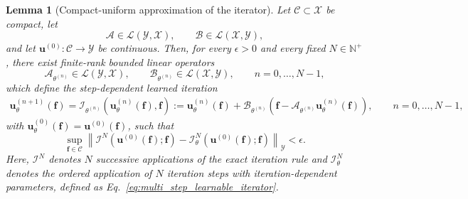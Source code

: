 \documentclass[preprint,numbers,sort&compress]{elsarticle}
\newtheorem{lemma}{Lemma}
\begin{document}
			
			\begin{lemma}[Compact-uniform approximation of the iterator]
				\label{lem:univ_iter}
				Let $\mathcal C\subset\mathcal X$ be compact,
				let
				\[
				\mathcal A\in\mathcal L(\mathcal Y,\mathcal X),
				\qquad
				\mathcal B\in\mathcal L(\mathcal X,\mathcal Y),
				\]
				and let
				$\boldsymbol u^{(0)}:\mathcal C\to\mathcal Y$
				be continuous. 
				Then, for every $\epsilon>0$ and every fixed
				$N\in\mathbb N^+$, there exist finite-rank bounded linear operators
				\[
				\mathcal A_{\theta^{(n)}}
				\in\mathcal L(\mathcal Y,\mathcal X),
				\qquad
				\mathcal B_{\theta^{(n)}}
				\in\mathcal L(\mathcal X,\mathcal Y),
				\qquad
				n=0,\ldots,N-1,
				\]
				which define the step-dependent learned iteration
				\[
				\begin{aligned}
					\boldsymbol u_\theta^{(n+1)}(\boldsymbol f)
					=
					\mathcal I_{\theta^{(n)}}\left(
					\boldsymbol u_\theta^{(n)}(\boldsymbol f),
					\boldsymbol f
					\right)
					:=
					\boldsymbol u_\theta^{(n)}(\boldsymbol f)
					+
					\mathcal B_{\theta^{(n)}}
					\left(
					\boldsymbol f
					-
					\mathcal A_{\theta^{(n)}}
					\boldsymbol u_\theta^{(n)}(\boldsymbol f)
					\right),
					\qquad
					n=0,\ldots,N-1,
				\end{aligned}
				\]
				with $\boldsymbol u_\theta^{(0)}(\boldsymbol f)
				= \boldsymbol u^{(0)}(\boldsymbol f)$, 
				such that
				\[
				\sup_{\boldsymbol f\in\mathcal C}
				\left\|
				\mathcal I^N\left(
				\boldsymbol u^{(0)}(\boldsymbol f);
				\boldsymbol f
				\right)
				-
				\mathcal I_\theta^N\left(
				\boldsymbol u^{(0)}(\boldsymbol f);
				\boldsymbol f
				\right)
				\right\|_{\mathcal Y}
				<\epsilon.
				\]
				Here, $\mathcal I^N$ denotes $N$ successive applications of the exact
				iteration rule and $\mathcal I_\theta^N$ denotes the ordered application of $N$
				iteration steps with iteration-dependent parameters, defined as Eq.~\eqref{eq:multi_step_learnable_iterator}.
			\end{lemma}
			
\end{document}
